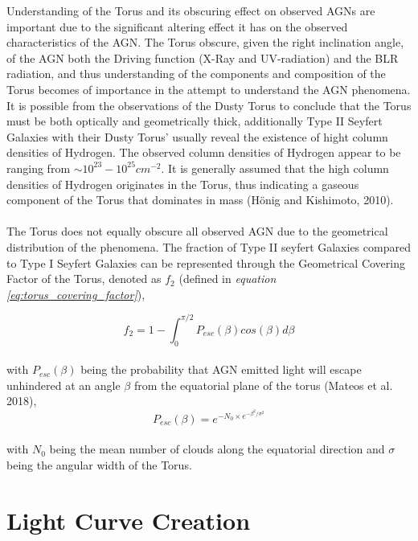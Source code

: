 \documentclass[11pt]{article}
\begin{document}
Understanding of the Torus and its obscuring effect on observed AGNs are important due to the significant altering effect it has on the observed characteristics of the AGN. The Torus obscure, given the right inclination angle, of the AGN both the Driving function (X-Ray and UV-radiation) and the BLR radiation, and thus understanding of the components and composition of the Torus becomes of importance in the attempt to understand the AGN phenomena. It is possible from the observations of the Dusty Torus to conclude that the Torus must be both optically and geometrically thick, additionally Type II Seyfert Galaxies with their Dusty Torus' usually reveal the existence of hight column densities of Hydrogen. The observed column densities of Hydrogen appear to be ranging from $\sim 10^{23} - 10^{25} cm^{-2}$. It is generally assumed that the high column densities of Hydrogen originates in the Torus, thus indicating a gaseous component of the Torus that dominates in mass (Hönig and Kishimoto, 2010). \\
\\
The Torus does not equally obscure all observed AGN due to the geometrical distribution of the phenomena. The fraction of Type II seyfert Galaxies compared to Type I Seyfert Galaxies can be represented through the Geometrical Covering Factor of the Torus, denoted as $f_{2}$ (defined in \emph{equation \ref{eq:torus_covering_factor}}),

\begin{equation}
f_2 = 1 - \int_{0}^{\pi/2}P_{esc}(\beta)cos(\beta)d\beta
\label{eq:torus_covering_factor}
\end{equation}\\
with $P_{esc}(\beta)$ being the probability that AGN emitted light will escape unhindered at an angle $\beta$ from the equatorial plane of the torus (Mateos et al. 2018),
\begin{equation}
P_{esc}(\beta) = e^{-N_{0} \times e^{-\beta^{2}/\sigma^{2}}}
\label{eq:P_covering_factor}
\end{equation}\\
with $N_{0}$ being the mean number of clouds along the equatorial direction and $\sigma$ being the angular width of the Torus. 



\section{Light Curve Creation}
\end{document}
